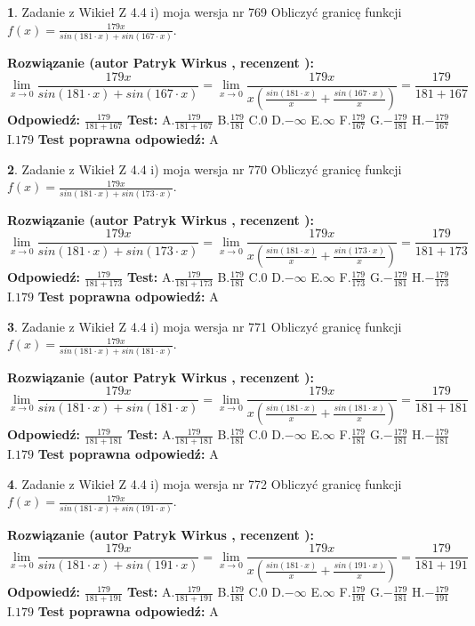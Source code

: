\documentclass[12pt, a4paper]{article}
\theoremstyle{definition} %
\newtheorem{zad}{}
\newcommand{\zadStart}[1]{\begin{zad}#1\newline}
\newcommand{\zadStop}{\end{zad}}
\newcommand{\rozwStart}[2]{\noindent \textbf{Rozwiązanie (autor #1 , recenzent #2): }\newline}
\newcommand{\rozwStop}{\newline}
\newcommand{\odpStart}{\noindent \textbf{Odpowiedź:}\newline}
\newcommand{\odpStop}{\newline}
\newcommand{\testStart}{\noindent \textbf{Test:}\newline}
\newcommand{\testStop}{\newline}
\newcommand{\kluczStart}{\noindent \textbf{Test poprawna odpowiedź:}\newline}
\newcommand{\kluczStop}{\newline}
\begin{document}
\zadStart{Zadanie z Wikieł Z 4.4 i) moja wersja nr 769}
Obliczyć granicę funkcji $f(x)=\frac{179x}{sin(181\cdot x) +sin(167\cdot x)}$.
\zadStop
\rozwStart{Patryk Wirkus}{}
$$\lim\limits_{x\to 0}\frac{179x}{sin(181\cdot x) +sin(167\cdot x)}=\lim\limits_{x\to 0}\frac{179x}{x(\frac{sin(181\cdot x)}{x}+\frac{sin(167\cdot x)}{x})}=\frac{179}{181+167}$$
\rozwStop
\odpStart
$\frac{179}{181+167}$
\odpStop
\testStart
A.$\frac{179}{181+167}$
B.$\frac{179}{181}$
C.$0$
D.$-\infty$
E.$\infty$
F.$\frac{179}{167}$
G.$-\frac{179}{181}$
H.$-\frac{179}{167}$
I.$179$
\testStop
\kluczStart
A
\kluczStop



\zadStart{Zadanie z Wikieł Z 4.4 i) moja wersja nr 770}
Obliczyć granicę funkcji $f(x)=\frac{179x}{sin(181\cdot x) +sin(173\cdot x)}$.
\zadStop
\rozwStart{Patryk Wirkus}{}
$$\lim\limits_{x\to 0}\frac{179x}{sin(181\cdot x) +sin(173\cdot x)}=\lim\limits_{x\to 0}\frac{179x}{x(\frac{sin(181\cdot x)}{x}+\frac{sin(173\cdot x)}{x})}=\frac{179}{181+173}$$
\rozwStop
\odpStart
$\frac{179}{181+173}$
\odpStop
\testStart
A.$\frac{179}{181+173}$
B.$\frac{179}{181}$
C.$0$
D.$-\infty$
E.$\infty$
F.$\frac{179}{173}$
G.$-\frac{179}{181}$
H.$-\frac{179}{173}$
I.$179$
\testStop
\kluczStart
A
\kluczStop



\zadStart{Zadanie z Wikieł Z 4.4 i) moja wersja nr 771}
Obliczyć granicę funkcji $f(x)=\frac{179x}{sin(181\cdot x) +sin(181\cdot x)}$.
\zadStop
\rozwStart{Patryk Wirkus}{}
$$\lim\limits_{x\to 0}\frac{179x}{sin(181\cdot x) +sin(181\cdot x)}=\lim\limits_{x\to 0}\frac{179x}{x(\frac{sin(181\cdot x)}{x}+\frac{sin(181\cdot x)}{x})}=\frac{179}{181+181}$$
\rozwStop
\odpStart
$\frac{179}{181+181}$
\odpStop
\testStart
A.$\frac{179}{181+181}$
B.$\frac{179}{181}$
C.$0$
D.$-\infty$
E.$\infty$
F.$\frac{179}{181}$
G.$-\frac{179}{181}$
H.$-\frac{179}{181}$
I.$179$
\testStop
\kluczStart
A
\kluczStop



\zadStart{Zadanie z Wikieł Z 4.4 i) moja wersja nr 772}
Obliczyć granicę funkcji $f(x)=\frac{179x}{sin(181\cdot x) +sin(191\cdot x)}$.
\zadStop
\rozwStart{Patryk Wirkus}{}
$$\lim\limits_{x\to 0}\frac{179x}{sin(181\cdot x) +sin(191\cdot x)}=\lim\limits_{x\to 0}\frac{179x}{x(\frac{sin(181\cdot x)}{x}+\frac{sin(191\cdot x)}{x})}=\frac{179}{181+191}$$
\rozwStop
\odpStart
$\frac{179}{181+191}$
\odpStop
\testStart
A.$\frac{179}{181+191}$
B.$\frac{179}{181}$
C.$0$
D.$-\infty$
E.$\infty$
F.$\frac{179}{191}$
G.$-\frac{179}{181}$
H.$-\frac{179}{191}$
I.$179$
\testStop
\kluczStart
A
\kluczStop
\end{document}
